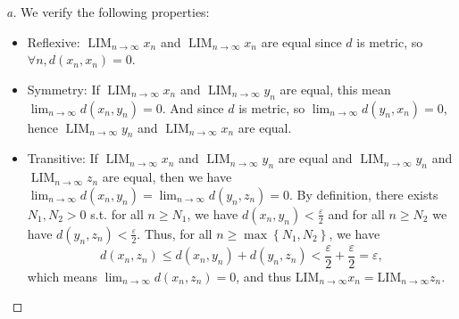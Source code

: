 \begin{proof}[a] %
  We verify the following properties:
    \begin{itemize}
        \item Reflexive: $\operatorname{LIM}_{n\to\infty} x_n$ and $\operatorname{LIM}_{n\to\infty} x_n$ are equal since $d$ is metric, so $\forall n, d(x_n, x_n) = 0$.
        \item Symmetry: If $\operatorname{LIM}_{n\to\infty} x_n$ and $\operatorname{LIM}_{n\to\infty} y_n$ are equal, this mean $\lim_{n\to\infty} d(x_n,y_n) = 0$. And since $d$ is metric, so $\lim_{n\to\infty} d(y_n,x_n) = 0$, hence $\operatorname{LIM}_{n\to\infty} y_n$ and $\operatorname{LIM}_{n\to\infty} x_n$ are equal.
        \item Transitive: If $\operatorname{LIM}_{n\to\infty} x_n$ and $\operatorname{LIM}_{n\to\infty} y_n$ are equal and $\operatorname{LIM}_{n\to\infty} y_n$ and $\operatorname{LIM}_{n\to\infty} z_n$ are equal, then we have \(\lim_{n \to \infty} d(x_n, y_n) = \lim_{n \to \infty}  d(y_n, z_n) = 0  \). By definition, there exists \(N_1, N_2 > 0\) s.t. for all \(n \ge N_1\), we have \(d(x_n, y_n) < \frac{\varepsilon}{2}\) and for all \(n \ge N_2\) we have \(d(y_n, z_n) < \frac{\varepsilon}{2}\). Thus, for all \(n \ge \max \left\{ N_1, N_2 \right\} \), we have
        \[
            d(x_n, z_n) \le d(x_n, y_n) + d(y_n, z_n) < \frac{\varepsilon}{2} + \frac{\varepsilon}{2} = \varepsilon ,
        \] which means \(\lim_{n \to \infty} d(x_n, z_n) = 0 \), and thus \(\mathrm{LIM}_{n \to \infty} x_n = \mathrm{LIM}_{n \to \infty } z_n  \).  
    \end{itemize}
\end{proof}

